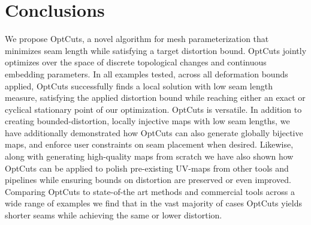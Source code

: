 
\section{Conclusions}
\label{sec:conclusion}

We propose OptCuts, a novel algorithm for mesh parameterization that minimizes seam length while satisfying a target distortion bound. OptCuts jointly optimizes over the space of discrete topological changes and continuous embedding parameters. In all examples tested, across all deformation bounds applied, OptCuts successfully finds a local solution with low seam length measure, satisfying the applied distortion bound while reaching either an exact or cyclical stationary point of our optimization. OptCuts is versatile. In addition to creating bounded-distortion, locally injective maps with low seam lengths, we have additionally demonstrated how OptCuts can also generate globally bijective maps, and enforce user constraints on seam placement when desired. Likewise, along with generating high-quality maps from scratch we have also shown how OptCuts can be applied to polish pre-existing UV-maps from other tools and pipelines while ensuring bounds on distortion are preserved or even improved. Comparing OptCuts to state-of-the art methods and commercial tools across a wide range of examples we find that in the vast majority of cases OptCuts yields shorter seams while achieving the same or lower distortion. 

